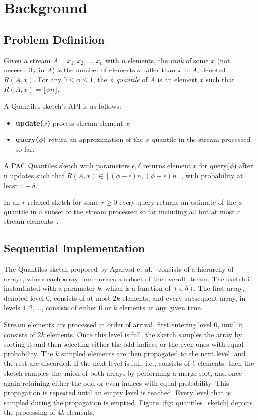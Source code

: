 \chapter{Background}
\label{chap:background}


\section{Problem Definition} \label{sec:problem_define}

Given a stream $A=x_1,x_2,\dots,x_n$ with $n$ elements,
the \emph{rank} of some $x$ (not necessarily in $A$) is the number of elements smaller than $x$ in $A$, denoted $R(A,x)$. For any $0 \leq \phi \leq 1$, the \emph{$\phi$ quantile} of $A$ is an element $x$ such that $R(A,x)=\lfloor \phi n \rfloor$.

A Quantiles sketch's API is as follows:
\begin{itemize}
\item \textbf{update(}$x$\textbf{)} process stream element $x$;
\item \textbf{query(}$\phi$\textbf{)} return an approximation of the $\phi$ quantile in the stream processed so far. 
\end{itemize}
A PAC Quantiles sketch with parameters $\epsilon, \delta$ returns element $x$ for query($\phi$) after n updates such that $R(A,x) \in \left[ (\phi-\epsilon)n,(\phi+\epsilon)n  \right]$, with probability at least $1-\delta$.

In an $r$-relaxed sketch for some $r\geq0$ every query returns an estimate of the $\phi$ quantile in a subset of the stream processed so far including all but at most $r$ stream elements~\cite{Henzinger_2013_Quantitative_Relaxation, Rinberg_2020_fast_sketches}.


\section{Sequential Implementation} \label{sec:seq_imp}


The Quantiles sketch proposed by Agarwal et al.~\cite{mergeables_summaries} consists of a hierarchy of arrays, where each array summarizes a subset of the overall stream. The sketch is instantiated with a parameter $k$, which is a function of $(\epsilon,\delta)$. The first array, denoted level $0$, consists of at most $2k$ elements, and every subsequent array, in levels $1,2,\dots$, consists of either $0$ or $k$ elements at any given time.

Stream elements are processed in order of arrival, first entering level $0$, until it consists of $2k$ elements. Once this level is full, the sketch samples the array by sorting it and then selecting either the odd indices or the even ones with equal probability. The $k$ sampled elements are then propagated to the next level, and the rest are discarded. If the next level is full, i.e., consists of $k$ elements, then the sketch samples the union of both arrays by performing a merge sort, and once again retaining either the odd or even indices with equal probability. This propagation is repeated until an empty level is reached. Every level that is sampled during the propagation is emptied. Figure~\ref{fig: quantiles_sketch} depicts the processing of $4k$ elements.

